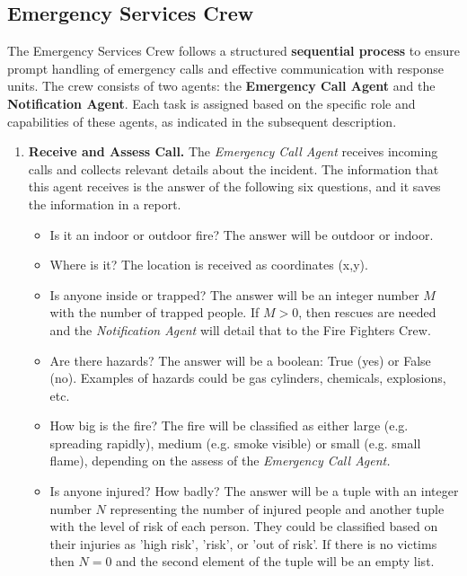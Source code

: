 \subsection{Emergency Services Crew}

The Emergency Services Crew follows a structured \textbf{sequential process} to ensure prompt handling of emergency calls and
 effective communication with response units. The crew consists of two agents: the \textbf{Emergency Call Agent} and the 
 \textbf{Notification Agent}. Each task is assigned based on the specific role and capabilities of these agents, as indicated in the 
 subsequent description.

\begin{enumerate}
    \item \textbf{Receive and Assess Call.} The \textit{Emergency Call Agent} receives incoming calls and collects relevant details
     about the incident. The information that this agent receives is the answer of the following six questions, and it saves the information
     in a report.
     \begin{itemize}
        \item Is it an indoor or outdoor fire? The answer will be outdoor or indoor.
        \item Where is it? The location is received as coordinates (x,y).
        \item Is anyone inside or trapped? The answer will be an integer number $M$ with the number of trapped people. If $M>0$, then rescues are needed and 
        the \textit{Notification Agent} will detail that to the Fire Fighters Crew.
        \item Are there hazards? The answer will be a boolean: True (yes) or False (no). Examples of hazards could be gas cylinders, 
        chemicals, explosions, etc.
        \item How big is the fire? The fire will be classified as either large (e.g. spreading rapidly), medium (e.g. smoke visible) or 
        small (e.g. small flame), depending on the assess of the \textit{Emergency Call Agent.}
        \item Is anyone injured? How badly? The answer will be a tuple with an integer number $N$ representing the number of injured 
        people and another tuple with the level of risk of each person. They could be classified based on their injuries as 'high risk',
         'risk', or 'out of risk'. If there is no victims then $N=0$ and the second element of the tuple will be an empty list.
    \end{itemize}
    

\end{enumerate}
